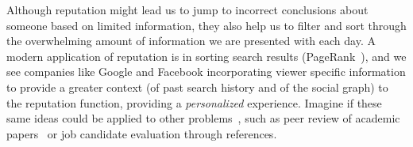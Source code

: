 Although reputation might lead us to jump to incorrect conclusions about
someone based on limited information, they also help us to filter and
sort through the overwhelming amount of information we are presented
with each day.
A modern application of reputation is in sorting search
results (\eg PageRank~\cite{Page1999}), and we see companies
like Google and Facebook incorporating viewer specific information
to provide a greater context (of past search history and of
the social graph) to the reputation function, providing a
\textit{personalized} experience.
Imagine if these same ideas could be applied to other problems~\cite{Adler2011b},
such as peer review of academic papers~\cite{Adler2010a}
or job candidate evaluation through references.

